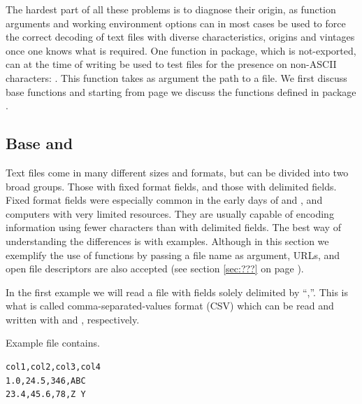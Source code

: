 \documentclass[krantz2]{krantz}\usepackage{knitr}%
\begin{document}
\begin{explainbox}
The hardest part of all these problems is to diagnose their origin, as function arguments and working environment options can in most cases be used to force the correct decoding of text files with diverse characteristics, origins and vintages once one knows what is required. One function in \Rlang {} package, which is not-exported, can at the time of writing be used to test files for the presence on non-ASCII characters: . This function takes as argument the path to a file. We first discuss base \Rlang functions and starting from page \pageref{sec:files:readr} we discuss the functions defined in package .
\end{explainbox}

\subsection[Base R and `utils']{Base \Rlang and }

Text files come in many different sizes and formats, but can be divided into two broad groups. Those with fixed format fields, and those with delimited fields. Fixed format fields were especially common in the early days of  and , and computers with very limited resources. They are usually capable of encoding information using fewer characters than with delimited fields. The best way of understanding the differences is with examples. Although in this section we exemplify the use of functions by passing a file name as argument, URLs, and open file descriptors are also accepted (see section \ref{sec:???} on page \pageref{sec:???}).

In the first example we will read a file with fields solely delimited by ``,''. This is what is called comma-separated-values format (CSV) which can be read and written with  and , respectively.

Example file  contains.

\begin{knitrout}\footnotesize
{}\color{fgcolor}\begin{kframe}
\begin{verbatim}
col1,col2,col3,col4
1.0,24.5,346,ABC
23.4,45.6,78,Z Y
\end{verbatim}
\end{kframe}
\end{knitrout}
\end{document}
